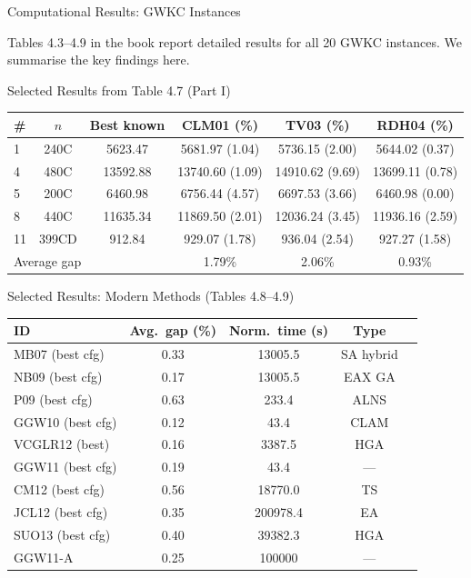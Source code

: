 \documentclass[aspectratio=169,10pt]{beamer}
\begin{document}
\begin{frame}[allowframebreaks]{Computational Results: GWKC Instances}

  Tables 4.3--4.9 in the book report detailed results for all 20 GWKC
  instances.  We summarise the key findings here.

  \begin{block}{Selected Results from Table 4.7 (Part I)}
    \small
    \begin{center}
    \begin{tabular}{lccccc}
      \toprule
      \# & $n$ & Best known & CLM01 (\%) & TV03 (\%) & RDH04 (\%) \\
      \midrule
      1  & 240C  & 5623.47  & 5681.97 (1.04) & 5736.15 (2.00) & 5644.02 (0.37) \\
      4  & 480C  & 13592.88 & 13740.60 (1.09) & 14910.62 (9.69) & 13699.11 (0.78)\\
      5  & 200C  & 6460.98  & 6756.44 (4.57) & 6697.53 (3.66) & 6460.98 (0.00) \\
      8  & 440C  & 11635.34 & 11869.50 (2.01) & 12036.24 (3.45) & 11936.16 (2.59)\\
      11 & 399CD & 912.84   & 929.07 (1.78)  & 936.04 (2.54)  & 927.27 (1.58)  \\
      \midrule
      \multicolumn{3}{l}{Average gap} & 1.79\% & 2.06\% & 0.93\% \\
      \bottomrule
    \end{tabular}
    \end{center}
  \end{block}

  \begin{block}{Selected Results: Modern Methods (Tables 4.8--4.9)}
    \small
    \begin{center}
    \begin{tabular}{lcccc}
      \toprule
      ID & Avg.\ gap (\%) & Norm.\ time (s) & Type \\
      \midrule
      MB07 (best cfg) & 0.33 & 13005.5 & SA hybrid \\
      NB09 (best cfg) & 0.17 & 13005.5 & EAX GA \\
      P09  (best cfg) & 0.63 & 233.4   & ALNS \\
      GGW10 (best cfg)& 0.12 & 43.4    & CLAM \\
      VCGLR12 (best)  & 0.16 & 3387.5  & HGA \\
      GGW11 (best cfg)& 0.19 & 43.4    & --- \\
      CM12 (best cfg) & 0.56 & 18770.0 & TS \\
      JCL12 (best cfg)& 0.35 & 200978.4 & EA \\
      SUO13 (best cfg)& 0.40 & 39382.3  & HGA \\
      GGW11-A & 0.25 & 100000  & --- \\
      \bottomrule
    \end{tabular}
    \end{center}
  \end{block}


\end{frame}
\end{document}
